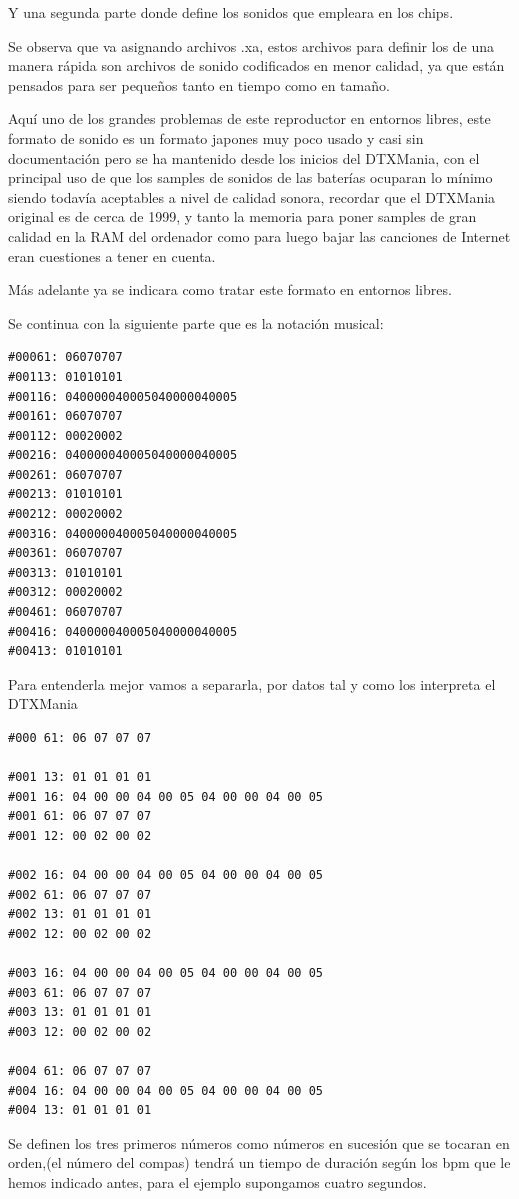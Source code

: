 \documentclass[a4paper,11pt,oneside]{book}
\begin{document}
Y una segunda parte donde define los sonidos que empleara en los chips.

Se observa que va asignando archivos .xa, estos archivos para definir los de una manera rápida son archivos de sonido codificados en menor calidad, ya que están pensados para ser pequeños tanto en tiempo como en tamaño.


Aquí uno de los grandes problemas de este reproductor en entornos libres, este formato de sonido es un formato japones muy poco usado y casi sin documentación pero se ha mantenido desde los inicios del DTXMania, con el principal uso de que los samples de sonidos de las baterías ocuparan lo mínimo siendo todavía aceptables a nivel de calidad sonora, recordar que el DTXMania original es de cerca de 1999, y tanto la memoria para poner samples de gran calidad en la RAM del ordenador como para luego bajar las canciones de Internet eran cuestiones a tener en cuenta.


Más adelante ya se indicara como tratar este formato en entornos libres.

Se continua con la siguiente parte que es la notación musical:

\begin{Verbatim}[frame=single]
#00061: 06070707
#00113: 01010101
#00116: 040000040005040000040005
#00161: 06070707
#00112: 00020002
#00216: 040000040005040000040005
#00261: 06070707
#00213: 01010101
#00212: 00020002
#00316: 040000040005040000040005
#00361: 06070707
#00313: 01010101
#00312: 00020002
#00461: 06070707
#00416: 040000040005040000040005
#00413: 01010101
\end{Verbatim}

Para entenderla mejor vamos a separarla, por datos tal y como los interpreta el DTXMania

\begin{Verbatim}[frame=single]
#000 61: 06 07 07 07

#001 13: 01 01 01 01
#001 16: 04 00 00 04 00 05 04 00 00 04 00 05
#001 61: 06 07 07 07
#001 12: 00 02 00 02

#002 16: 04 00 00 04 00 05 04 00 00 04 00 05
#002 61: 06 07 07 07
#002 13: 01 01 01 01
#002 12: 00 02 00 02

#003 16: 04 00 00 04 00 05 04 00 00 04 00 05
#003 61: 06 07 07 07
#003 13: 01 01 01 01
#003 12: 00 02 00 02

#004 61: 06 07 07 07
#004 16: 04 00 00 04 00 05 04 00 00 04 00 05
#004 13: 01 01 01 01
\end{Verbatim}

Se definen los tres primeros números como números en sucesión que se tocaran en orden,(el número del compas) tendrá un tiempo de duración según los bpm que le hemos indicado antes, para el ejemplo supongamos cuatro segundos.
\end{document}
